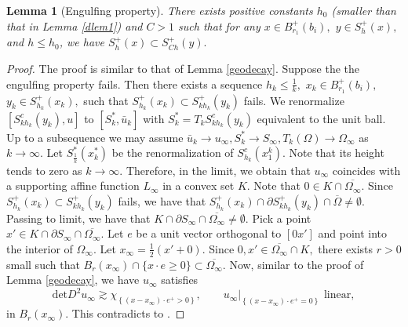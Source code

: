 \documentclass[11pt]{amsart}
\theoremstyle{plain}
\newtheorem{lemma}{Lemma}[section]
\renewcommand{\det}{\mbox{det}}
\newcommand{\0}{\textbf{0}}
\numberwithin{equation}{section}
\numberwithin{equation}{section}
\numberwithin{figure}{section}
\begin{document}
	\begin{lemma}[Engulfing property]\label{engulfing2}
		There exists positive constants $h_0$ (smaller than that in Lemma \ref{dlem1}) and $C>1$ such that for any
		$x\in B^{+}_{r_1}(b_i),$ $y\in S^{+}_h(x),$ and $h\leq h_0$, we have $S^{+}_h(x)\subset S^{+}_{Ch}(y).$
	\end{lemma}
	\begin{proof}
		The proof is similar to that of Lemma \ref{geodecay}. 
		Suppose the the engulfing property fails. Then there exists a sequence $h_k\leq \frac{1}{k},$
		$x_k\in B^{+}_{r_1}(b_i),$ $y_k\in S^{+}_{h_k}(x_k),$ such that 
		$S^{+}_{h_k}(x_k)\subset S^{+}_{kh_k}(y_k)$ fails.
		We renormalize $\left[S^c_{kh_k}(y_k), u\right]$ to $\left[S_k^*, \bar{u}_k\right]$ with $S_k^*=T_kS^c_{kh_k}(y_k)$ equivalent to the unit ball. 
		Up to a subsequence we may assume
		$\bar u_k\rightarrow u_\infty, S^*_k\rightarrow S_\infty, T_k(\Omega)\rightarrow \Omega_\infty$ as $k\rightarrow \infty.$
		Let  $S^*_{\frac{1}{k}}(x^*_k)$ be the renormalization of
		$S^c_{h_k}\left(x_1^k\right).$ Note that its height tends to zero as $k\rightarrow \infty.$ Therefore, in the limit, we obtain that $u_{\infty}$ coincides with a 
		supporting affine function $L_{\infty}$ in a convex set $K.$ Note that $0\in K\cap\overline{\Omega_\infty}.$
		Since $S^{+}_{h_k}(x_k)\subset S^{+}_{kh_k}(y_k)$ fails, we have that
		$S^{+}_{h_k}(x_k)\cap \partial S^{+}_{kh_k}(y_k)\cap \overline{\Omega}\ne \emptyset.$ 	
		Passing to limit, 
		we have that $K\cap\partial S_\infty\cap \overline{\Omega_\infty}\ne\emptyset. $
		Pick a point $x'\in K\cap\partial S_\infty\cap \overline{\Omega_\infty}.$
		Let $e$ be a unit vector orthogonal to $[0x']$ and point into the interior of  $\Omega_{\infty}.$
		Let $x_\infty=\frac{1}{2}(x'+0).$ Since $0, x'\in \overline{\Omega_\infty}\cap K,$ 
		there exists $r>0$ small such that $B_r(x_\infty)\cap \{x\cdot e\geq 0\}\subset \overline{\Omega_\infty}.$
		Now, similar to the proof of Lemma \ref{geodecay}, we have $u_{\infty}$  satisfies
		\begin{equation}\label{nonexieq}
			\det D^2 u_{\infty}\gtrsim \chi_{\left\{(x-x_{\infty})\cdot e^+>0\right\}} ,\qquad u_{\infty}|_{\left\{(x-x_{\infty})\cdot e^+=0\right\}}\text{ linear},
		\end{equation}
		in $B_r(x_{\infty}).$ 
		This contradicts to \cite[Lemma 6.1]{CR}.
	\end{proof}
	
\end{document}
